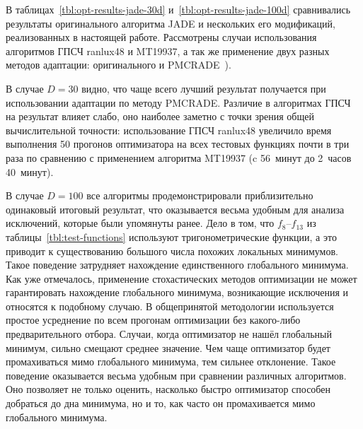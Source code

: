 В таблицах~\ref{tbl:opt-results-jade-30d}
и~\ref{tbl:opt-results-jade-100d} сравнивались результаты
оригинального алгоритма JADE и нескольких его модификаций,
реализованных в настоящей работе. Рассмотрены случаи использования
алгоритмов ГПСЧ ranlux48 и MT19937, а так же применение двух разных
методов адаптации: оригинального и PMCRADE~\cite{Li-PMCRADE-2011}).

В случае $D=30$ видно, что чаще всего лучший результат получается при
использовании адаптации по методу PMCRADE. Различие в алгоритмах ГПСЧ
на результат влияет слабо, оно наиболее заметно с точки зрения общей
вычислительной точности: использование ГПСЧ ranlux48 увеличило
время выполнения 50 прогонов оптимизатора на всех тестовых функциях
почти в три раза по сравнению с применением алгоритма MT19937 (c
56~минут до 2~часов 40~минут).

В случае $D=100$ все алгоритмы продемонстрировали приблизительно
одинаковый итоговый результат, что оказывается весьма удобным для
 анализа исключений, которые были упомянуты
ранее. Дело в том, что $f_8$--$f_{13}$ из
таблицы~\ref{tbl:test-functions} используют тригонометрические
функции, а это приводит к существованию большого числа похожих локальных
минимумов. Такое поведение затрудняет нахождение единственного
глобального минимума.  Как уже отмечалось, применение стохастических
методов оптимизации не может гарантировать нахождение глобального
минимума, возникающие исключения и относятся к подобному случаю. В
общепринятой методологии используется простое усреднение по всем
прогонам оптимизации без какого-либо предварительного отбора.  Случаи,
когда оптимизатор не нашёл глобальный минимум, сильно смещают среднее
значение.  Чем чаще оптимизатор будет промахиваться мимо глобального
минимума, тем сильнее отклонение.  Такое поведение оказывается весьма
удобным при сравнении различных алгоритмов.  Оно позволяет не только
оценить, насколько быстро оптимизатор способен добраться до дна
минимума, но и то, как часто он промахивается мимо глобального
минимума.

